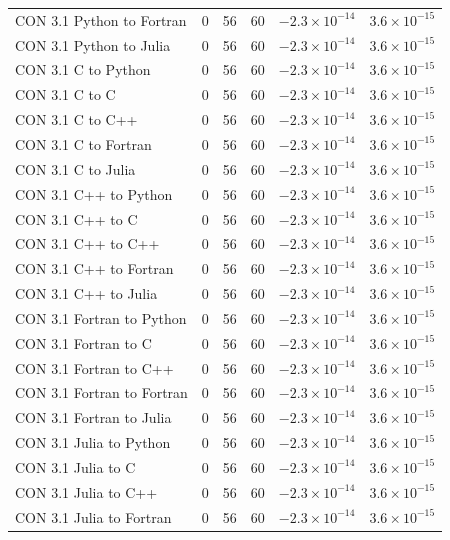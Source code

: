 \begin{table}[ht]
{\begin{tabular}{@{}lccccc@{}}
CON 3.1 Python to Fortran & 0 & 56 & 60 & \(-2.3\times10^{-14}\) & \(3.6\times10^{-15}\) \\
CON 3.1 Python to Julia & 0 & 56 & 60 & \(-2.3\times10^{-14}\) & \(3.6\times10^{-15}\) \\
CON 3.1 C to Python & 0 & 56 & 60 & \(-2.3\times10^{-14}\) & \(3.6\times10^{-15}\) \\
CON 3.1 C to C & 0 & 56 & 60 & \(-2.3\times10^{-14}\) & \(3.6\times10^{-15}\) \\
CON 3.1 C to C++ & 0 & 56 & 60 & \(-2.3\times10^{-14}\) & \(3.6\times10^{-15}\) \\
CON 3.1 C to Fortran & 0 & 56 & 60 & \(-2.3\times10^{-14}\) & \(3.6\times10^{-15}\) \\
CON 3.1 C to Julia & 0 & 56 & 60 & \(-2.3\times10^{-14}\) & \(3.6\times10^{-15}\) \\
CON 3.1 C++ to Python & 0 & 56 & 60 & \(-2.3\times10^{-14}\) & \(3.6\times10^{-15}\) \\
CON 3.1 C++ to C & 0 & 56 & 60 & \(-2.3\times10^{-14}\) & \(3.6\times10^{-15}\) \\
CON 3.1 C++ to C++ & 0 & 56 & 60 & \(-2.3\times10^{-14}\) & \(3.6\times10^{-15}\) \\
CON 3.1 C++ to Fortran & 0 & 56 & 60 & \(-2.3\times10^{-14}\) & \(3.6\times10^{-15}\) \\
CON 3.1 C++ to Julia & 0 & 56 & 60 & \(-2.3\times10^{-14}\) & \(3.6\times10^{-15}\) \\
CON 3.1 Fortran to Python & 0 & 56 & 60 & \(-2.3\times10^{-14}\) & \(3.6\times10^{-15}\) \\
CON 3.1 Fortran to C & 0 & 56 & 60 & \(-2.3\times10^{-14}\) & \(3.6\times10^{-15}\) \\
CON 3.1 Fortran to C++ & 0 & 56 & 60 & \(-2.3\times10^{-14}\) & \(3.6\times10^{-15}\) \\
CON 3.1 Fortran to Fortran & 0 & 56 & 60 & \(-2.3\times10^{-14}\) & \(3.6\times10^{-15}\) \\
CON 3.1 Fortran to Julia & 0 & 56 & 60 & \(-2.3\times10^{-14}\) & \(3.6\times10^{-15}\) \\
CON 3.1 Julia to Python & 0 & 56 & 60 & \(-2.3\times10^{-14}\) & \(3.6\times10^{-15}\) \\
CON 3.1 Julia to C & 0 & 56 & 60 & \(-2.3\times10^{-14}\) & \(3.6\times10^{-15}\) \\
CON 3.1 Julia to C++ & 0 & 56 & 60 & \(-2.3\times10^{-14}\) & \(3.6\times10^{-15}\) \\
CON 3.1 Julia to Fortran & 0 & 56 & 60 & \(-2.3\times10^{-14}\) & \(3.6\times10^{-15}\) \\

\end{tabular}}
\end{table}
